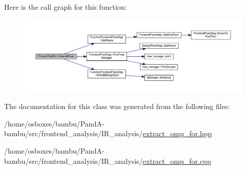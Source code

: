 Here is the call graph for this function\+:
\nopagebreak
\begin{figure}[H]
\begin{center}
\leavevmode
\includegraphics[width=350pt]{d5/d32/classExtractOmpFor_aedb821b92ea3f6554fc10e661377d059_cgraph}
\end{center}
\end{figure}


The documentation for this class was generated from the following files\+:\begin{DoxyCompactItemize}
\item 
/home/osboxes/bambu/\+Pand\+A-\/bambu/src/frontend\+\_\+analysis/\+I\+R\+\_\+analysis/\hyperlink{extract__omp__for_8hpp}{extract\+\_\+omp\+\_\+for.\+hpp}\item 
/home/osboxes/bambu/\+Pand\+A-\/bambu/src/frontend\+\_\+analysis/\+I\+R\+\_\+analysis/\hyperlink{extract__omp__for_8cpp}{extract\+\_\+omp\+\_\+for.\+cpp}\end{DoxyCompactItemize}

